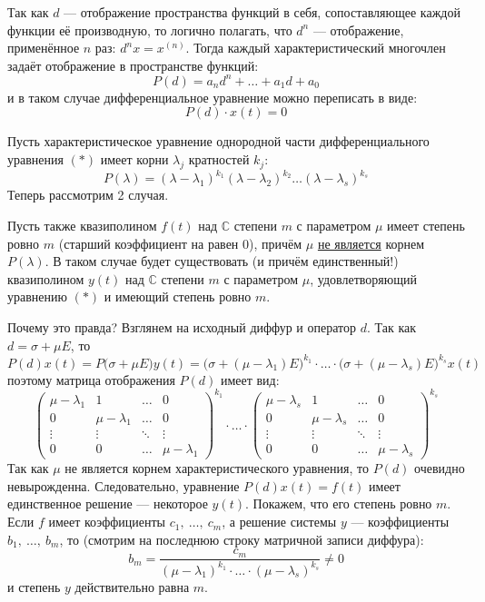 \documentclass[a4paper,12pt]{article}
\renewcommand{\C}{\mathbb{C}}
\begin{document}
Так как $d$ --- отображение пространства функций в себя, сопоставляющее каждой функции её производную, то логично полагать, что $d^n$ --- отображение, применённое $n$ раз: $d^nx = x^{(n)}$.
Тогда каждый характеристический многочлен задаёт отображение в пространстве функций:
\[P(d) = a_nd^n + \ldots + a_1d + a_0\]
и в таком случае дифференциальное уравнение можно переписать в виде:
\[P(d)\cdot x(t) = 0\]

Пусть характеристическое уравнение однородной части дифференциального уравнения $(*)$ имеет корни $\lambda_j$ кратностей $k_j$:
\[P(\lambda) = (\lambda - \lambda_1)^{k_1} (\lambda - \lambda_2)^{k_2}\ldots(\lambda - \lambda_s)^{k_s}\]
Теперь рассмотрим 2 случая.


Пусть также квазиполином $f(t)$ над $\C$ степени $m$ с параметром $\mu$ имеет степень ровно $m$ (старший коэффициент на равен 0), причём $\mu$ \underline{не является} корнем $P(\lambda)$.
В таком случае будет существовать (и причём единственный!) квазиполином $y(t)$ над $\C$ степени $m$ с параметром $\mu$, удовлетворяющий уравнению $(*)$ и имеющий степень ровно $m$.

Почему это правда?
Взглянем на исходный диффур и оператор $d$.
Так как $d = \sigma + \mu E$, то
\[P(d)x(t) = P\big(\sigma + \mu E\big)y(t) = \big(\sigma + (\mu - \lambda_1)E\big)^{k_1} \cdot \ldots \cdot \big(\sigma + (\mu - \lambda_s)E\big)^{k_s}x(t)\]
поэтому матрица отображения $P(d)$ имеет вид:
\[\begin{pmatrix}
	\mu - \lambda_1 & 1 & \ldots & 0\\
	0 & \mu - \lambda_1 & \ldots & 0\\
	\vdots & \vdots & \ddots & \vdots\\
	0 & 0 & \ldots & \mu - \lambda_1
\end{pmatrix}^{k_1}\cdot \ldots \cdot \begin{pmatrix}
\mu - \lambda_s & 1 & \ldots & 0\\
0 & \mu - \lambda_s & \ldots & 0\\
\vdots & \vdots & \ddots & \vdots\\
0 & 0 & \ldots & \mu - \lambda_s
\end{pmatrix}^{k_s}\]
Так как $\mu$ не является корнем характеристического уравнения, то $P(d)$ очевидно невырожденна. 
Следовательно, уравнение $P(d)x(t) = f(t)$ имеет единственное решение --- некоторое $y(t)$.
Покажем, что его степень ровно $m$.
Если $f$ имеет коэффициенты $c_1,\ \ldots,\ c_m$, а решение системы $y$ --- коэффициенты $b_1,\ \ldots,\ b_m$, то (смотрим на последнюю строку матричной записи диффура):
\[b_m = \dfrac{c_m}{(\mu - \lambda_1)^{k_1}\cdot \ldots \cdot (\mu - \lambda_s)^{k_s} }\neq 0\]
и степень $y$ действительно равна $m$.
\end{document}
